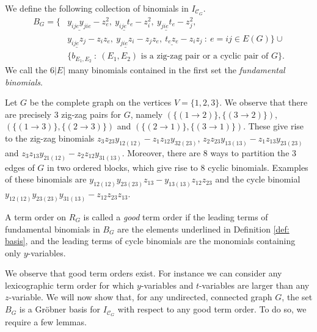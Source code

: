 \begin{defi}\label{def: basis}
	We define the following collection of binomials in $I_{\mathcal{C}_G}$.
	\begin{align*}
		B_G=\{& \underline{y_{ije}y_{jie}}-z_e^2,~ \underline{y_{ije}t_{e}}-z_i^2,~  \underline{y_{jie}t_{e}}-z_j^2,\\
		& \underline{y_{ije}z_j} - z_iz_e,~ \underline{y_{jie}z_i} - z_jz_e,~ \underline{t_{e}z_e} - z_iz_j ~:~ e=ij\in E(G)\} \cup\\
		& \{b_{E_1,E_2} ~ : ~ (E_1,E_2) \text{ is a zig-zag pair or a cyclic pair of $G$}\}.
	\end{align*}
	We call the $6|E|$ many binomials contained in the first set the \emph{fundamental binomials}.
\end{defi}
\begin{example}
    Let $G$ be the complete graph on the vertices $V=\{1,2,3\}$. We observe that there are precisely $3$ zig-zag pairs for $G$, namely $(\{(1\to 2)\},\{(3\to 2)\})$, $(\{(1\to 3)\},\{(2\to 3)\})$ and $(\{(2\to 1)\},\{(3\to 1)\})$. These give rise to the zig-zag binomials $z_{3}z_{23}y_{12(12)}-z_{1}z_{12}y_{32(23)}$, $z_{2}z_{23}y_{13(13)}-z_{1}z_{13}y_{23(23)}$ and $z_{3}z_{13}y_{21(12)}-z_{2}z_{12}y_{31(13)}$. Moreover, there are 8 ways to partition the $3$ edges of $G$ in two ordered blocks, which give rise to $8$ cyclic binomials. Examples of these binomials are $y_{12(12)}y_{23(23)}z_{13}-y_{13(13)}z_{12}z_{23}$ and the cycle binomial $y_{12(12)}y_{23(23)}y_{31(13)}-z_{12}z_{23}z_{13}$.
\end{example}
\begin{defi}\label{def : good}
    A term order on $R_G$ is called a \emph{good} term order if the leading terms of fundamental binomials in $B_G$ are the elements underlined in Definition \ref{def: basis}, and the leading terms of cycle binomials are the monomials containing only $y$-variables.
\end{defi}
We observe that good term orders exist. 
For instance we can consider any lexicographic term order for which $y$-variables and $t$-variables are larger than any $z$-variable.
We will now show that, for any undirected, connected graph $G$, the set $B_G$ is a Gr\"obner basis for $I_{\mathcal{C}_G}$ with respect to any good term order. 
To do so, we require a few lemmas. 

